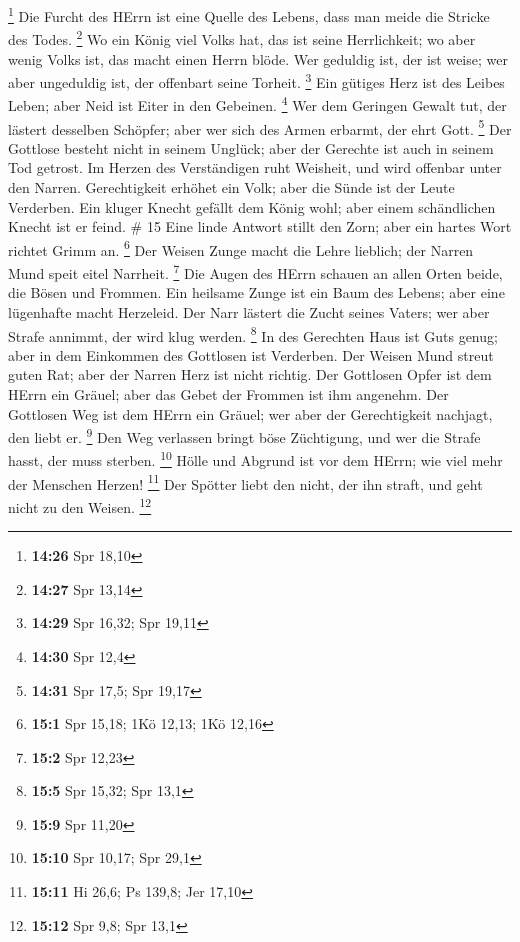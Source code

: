 \footnote{\textbf{14:26} Spr 18,10}  Die Furcht des HErrn
ist eine Quelle des Lebens, dass man meide die Stricke des Todes.
\footnote{\textbf{14:27} Spr 13,14}  Wo ein König viel
Volks hat, das ist seine Herrlichkeit; wo aber wenig Volks ist, das
macht einen Herrn blöde.  Wer geduldig ist, der ist weise;
wer aber ungeduldig ist, der offenbart seine Torheit. \footnote{\textbf{14:29}
  Spr 16,32; Spr 19,11}  Ein gütiges Herz ist des Leibes
Leben; aber Neid ist Eiter in den Gebeinen. \footnote{\textbf{14:30} Spr
  12,4}  Wer dem Geringen Gewalt tut, der lästert desselben
Schöpfer; aber wer sich des Armen erbarmt, der ehrt Gott. \footnote{\textbf{14:31}
  Spr 17,5; Spr 19,17}  Der Gottlose besteht nicht in
seinem Unglück; aber der Gerechte ist auch in seinem Tod getrost.
 Im Herzen des Verständigen ruht Weisheit, und wird
offenbar unter den Narren.  Gerechtigkeit erhöhet ein Volk;
aber die Sünde ist der Leute Verderben.  Ein kluger Knecht
gefällt dem König wohl; aber einem schändlichen Knecht ist er feind. \#
15  Eine linde Antwort stillt den Zorn; aber ein hartes Wort
richtet Grimm an. \footnote{\textbf{15:1} Spr 15,18; 1Kö 12,13; 1Kö
  12,16}  Der Weisen Zunge macht die Lehre lieblich; der
Narren Mund speit eitel Narrheit. \footnote{\textbf{15:2} Spr 12,23}
 Die Augen des HErrn schauen an allen Orten beide, die Bösen
und Frommen.  Ein heilsame Zunge ist ein Baum des Lebens;
aber eine lügenhafte macht Herzeleid.  Der Narr lästert die
Zucht seines Vaters; wer aber Strafe annimmt, der wird klug werden.
\footnote{\textbf{15:5} Spr 15,32; Spr 13,1}  In des
Gerechten Haus ist Guts genug; aber in dem Einkommen des Gottlosen ist
Verderben.  Der Weisen Mund streut guten Rat; aber der
Narren Herz ist nicht richtig.  Der Gottlosen Opfer ist dem
HErrn ein Gräuel; aber das Gebet der Frommen ist ihm angenehm.
 Der Gottlosen Weg ist dem HErrn ein Gräuel; wer aber der
Gerechtigkeit nachjagt, den liebt er. \footnote{\textbf{15:9} Spr 11,20}
 Den Weg verlassen bringt böse Züchtigung, und wer die
Strafe hasst, der muss sterben. \footnote{\textbf{15:10} Spr 10,17; Spr
  29,1}  Hölle und Abgrund ist vor dem HErrn; wie viel mehr
der Menschen Herzen! \footnote{\textbf{15:11} Hi 26,6; Ps 139,8; Jer
  17,10}  Der Spötter liebt den nicht, der ihn straft, und
geht nicht zu den Weisen. \footnote{\textbf{15:12} Spr 9,8; Spr 13,1}
